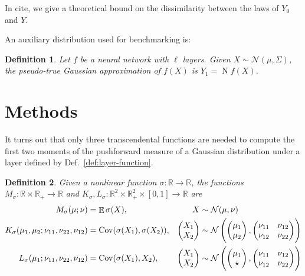 \documentclass{article}
\newtheorem{definition}{Definition}
\DeclareMathOperator{\expect}{\mathbb{E}}
\DeclareMathOperator{\Cov}{\operatorname{Cov}}
\DeclareMathOperator{\normal}{\mathrm N}
\begin{document}
In {\color{red} cite}, we give a theoretical bound on the dissimilarity between the laws of \(Y_0\) and \(Y\).

An auxiliary distribution used for benchmarking is:
\begin{definition}
    Let \(f \) be a neural network with \(\ell\) layers.
    Given \(X \sim \mathcal N(\mu, \Sigma)\), the pseudo-true Gaussian approximation of \(f(X)\) is \(Y_1 = \normal f(X)\).
\end{definition}

\section{Methods}
It turns out that only three transcendental functions are needed to compute the first two moments of the pushforward measure of a Gaussian distribution under a layer defined by Def.~\ref{def:layer-function}.
\begin{definition}
  \label{def:moment-maps}
  Given a nonlinear function \(\sigma: \mathbb{R} \to \mathbb R\),
  the functions \(M_\sigma: \mathbb{R}  \times \mathbb{R}_+ \to
  \mathbb{R}\) and \(K_\sigma, L_\sigma: \mathbb{R}^2 \times \mathbb
  R_+^2 \times [0, 1] \to \mathbb{R}\) are
  \begin{align*}
    M_\sigma(\mu; \nu) &= \expect{\sigma(X)},
    & X &\sim \mathcal N(\mu, \nu)
    \\
    K_\sigma(\mu_1, \mu_2; \nu_{11}, \nu_{22}, \nu_{12}) &= \Cov
    (\sigma(X_1), \sigma(X_2)),
    &
    \begin{pmatrix}
      X_1 \\ X_2
    \end{pmatrix} &\sim \mathcal N\del{
      \begin{pmatrix}
        \mu_1 \\ \mu_2
      \end{pmatrix},
      \begin{pmatrix}
        \nu_{11} & \nu_{12} \\
        \nu_{12} & \nu_{22}
      \end{pmatrix}
    }
    \\
    L_\sigma(\mu_1; \nu_{11}, \nu_{22}, \nu_{12}) &= \Cov
    (\sigma(X_1), X_2),
    &
    \begin{pmatrix}
      X_1 \\ X_2
    \end{pmatrix} &\sim \mathcal N\del{
      \begin{pmatrix}
        \mu_1 \\ \star
      \end{pmatrix},
      \begin{pmatrix}
        \nu_{11} & \nu_{12} \\
        \nu_{12} & \nu_{22}
      \end{pmatrix}
    }
    \\
  \end{align*}
\end{definition}
\end{document}
